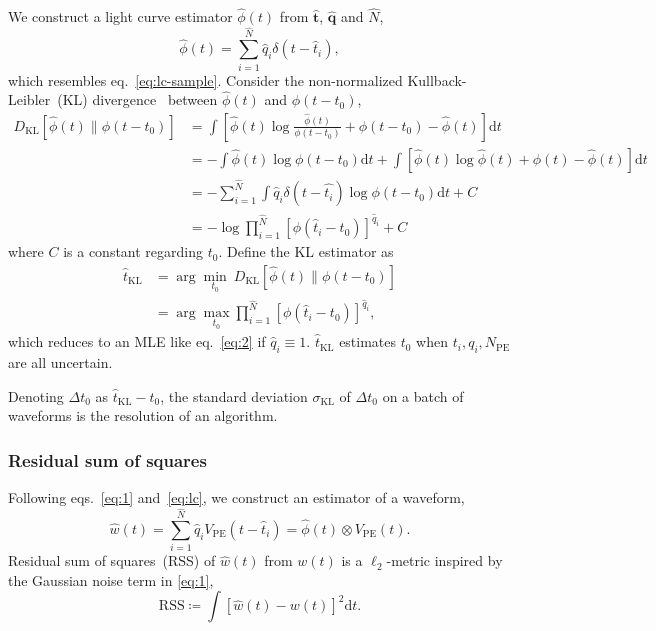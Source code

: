 We construct a light curve estimator $\hat{\phi}(t)$ from $\bm{\hat{t}}$, $\bm{\hat{q}}$ and $\hat{N}$,
\begin{equation}
  \label{eq:lc}
  \hat{\phi}(t) = \sum_{i=1}^{\hat{N}} \hat{q}_i\delta(t-\hat{t}_i),
\end{equation}
which resembles eq.~\eqref{eq:lc-sample}.
Consider the non-normalized Kullback-Leibler~(KL) divergence~\cite{mihoko_robust_2002} between $\hat{\phi}(t)$ and $\phi(t-t_{0})$,
\begin{equation}
  \begin{aligned}
    D_\mathrm{KL}\left[\hat{\phi}(t) \parallel \phi(t-t_0)\right] & =\int \left[\hat{\phi}(t) \log\frac{\hat{\phi}(t)}{\phi(t-t_0)} + \phi(t-t_0) - \hat{\phi}(t) \right]\mathrm{d}t \\
    & = - \int \hat{\phi}(t) \log\phi(t-t_0)\mathrm{d}t + \int \left[\hat{\phi}(t) \log\hat{\phi}(t) + \phi(t) - \hat{\phi}(t) \right]\mathrm{d}t \\
    & = - \sum_{i=1}^{\hat{N}}\int \hat{q}_i\delta(t-\hat{t_i}) \log\phi(t-t_0)\mathrm{d}t + C \\
    & = -\log \prod_{i=1}^{\hat{N}} \left[\phi(\hat{t}_i-t_0)\right]^{\hat{q}_i} + C
  \label{eq:kl}
  \end{aligned}
\end{equation}
where $C$ is a constant regarding $t_0$.  Define the KL estimator as
\begin{equation}
  \begin{aligned}
  \label{eq:pseudo}
  \hat{t}_\mathrm{KL} &= \arg\underset{t_0}{\min}~D_\mathrm{KL}\left[\hat{\phi}(t) \parallel \phi(t-t_0)\right] \\
  &= \arg\underset{t_0}{\max} \prod_{i=1}^{\hat{N}} \left[\phi(\hat{t}_i-t_0)\right]^{\hat{q}_i},
  \end{aligned}
\end{equation}
which reduces to an MLE like eq.~\eqref{eq:2} if $\hat{q}_i\equiv 1$.  $\hat{t}_\mathrm{KL}$ estimates $t_0$ when $t_i, q_i, N_\mathrm{PE}$ are all uncertain.

Denoting $\Delta t_0$ as $\hat{t}_\mathrm{KL} - t_0$, the standard deviation $\sigma_\mathrm{KL}$ of $\Delta t_0$ on a batch of waveforms is the resolution of an algorithm.

\subsubsection{Residual sum of squares}
\label{sec:rss}

Following eqs.~\eqref{eq:1} and~\eqref{eq:lc}, we construct an estimator of a waveform,
\begin{equation}
  \label{eq:w-hat}
  \hat{w}(t) = \sum_{i=1}^{\hat{N}}\hat{q}_i V_\mathrm{PE}(t-\hat{t}_i) = \hat{\phi}(t) \otimes V_\mathrm{PE}(t).
\end{equation}
Residual sum of squares~(RSS) of $\hat{w}(t)$ from $w(t)$ is a $\ell_2$-metric inspired by the Gaussian noise term in \eqref{eq:1},
\begin{equation}
  \label{eq:rss}
  \mathrm{RSS} \coloneqq\int\left[\hat{w}(t) - w(t)\right]^2\mathrm{d}t.
\end{equation}

